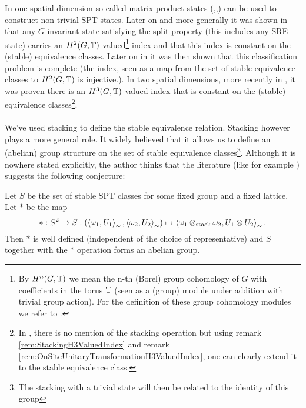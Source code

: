 \documentclass[11pt,a4paper,twoside]{article}
\numberwithin{equation}{section}
\begin{document}
In one spatial dimension so called matrix product states (\cite{Chen_2011},\cite{pollman2012symmetry},\cite{schuch2011MatrixProduct}) can be used to construct non-trivial SPT states. Later on and more generally it was shown in \cite{ogata2019classification} that any $G$-invariant state satisfying the split property (this includes any SRE state) carries an $H^2(G,\mathbb T)$-valued\footnote{By $H^n(G,\mathbb T)$ we mean the n-th (Borel) group cohomology of $G$ with coefficients in the torus $\mathbb T$ (seen as a (group) module under addition with trivial group action). For the definition of these group cohomology modules we refer to \cite{benson1991representations}.} index and that this index is constant on the (stable) equivalence classes. Later on in \cite{kapustin2021classification} it was then shown that this classification problem is complete (the index, seen as a map from the set of stable equivalence classes to $H^2(G,\mathbb T)$ is injective.). In two spatial dimensions, more recently in \cite{ogata2021h3gmathbb}, it was proven there is an $H^3(G,\mathbb T)$-valued index that is constant on the (stable) equivalence classes\footnote{In \cite{ogata2021h3gmathbb}, there is no mention of the stacking operation but using remark \ref{rem:StackingH3ValuedIndex} and remark \ref{rem:OnSiteUnitaryTransformationH3ValuedIndex}, one can clearly extend it to the stable equivalence class.}.
\\\\
We've used stacking to define the stable equivalence relation. Stacking however plays a more general role. It widely believed that it allows us to define an (abelian) group structure on the set of stable equivalence classes\footnote{The stacking with a trivial state will then be related to the identity of this group}. Although it is nowhere stated explicitly, the author thinks that the literature (like for example \cite{kapustin2021classification}) suggests the following conjecture:
\begin{conjecture}\label{conj:StableEquivGroupStructure}
	Let $S$ be the set of stable SPT classes for some fixed group and a fixed lattice. Let $*$ be the map
	\begin{equation}
		*:S^2\rightarrow S:(\expval{\omega_1,U_1}_{\sim},\expval{\omega_2,U_2}_{\sim})\mapsto \expval{\omega_1\otimes_\text{stack}\omega_2,U_1\otimes U_2}_{\sim}.
	\end{equation}
	Then $*$ is well defined (independent of the choice of representative) and $S$ together with the $*$ operation forms an abelian group.
\end{conjecture}
\end{document}
